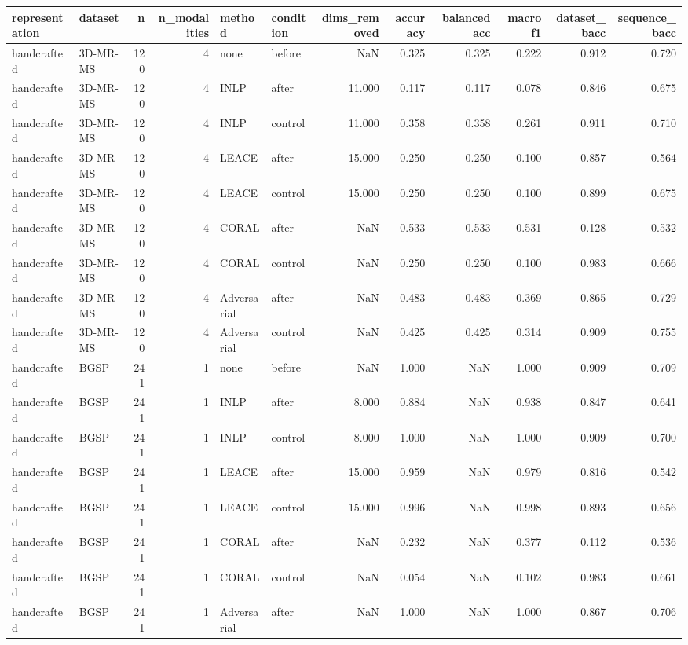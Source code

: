 \begin{tabular}{llrrllrrrrrr}
\toprule
representation & dataset & n & n\_modalities & method & condition & dims\_removed & accuracy & balanced\_acc & macro\_f1 & dataset\_bacc & sequence\_bacc \\
\midrule
handcrafted & 3D-MR-MS & 120 & 4 & none & before & NaN & 0.325 & 0.325 & 0.222 & 0.912 & 0.720 \\
handcrafted & 3D-MR-MS & 120 & 4 & INLP & after & 11.000 & 0.117 & 0.117 & 0.078 & 0.846 & 0.675 \\
handcrafted & 3D-MR-MS & 120 & 4 & INLP & control & 11.000 & 0.358 & 0.358 & 0.261 & 0.911 & 0.710 \\
handcrafted & 3D-MR-MS & 120 & 4 & LEACE & after & 15.000 & 0.250 & 0.250 & 0.100 & 0.857 & 0.564 \\
handcrafted & 3D-MR-MS & 120 & 4 & LEACE & control & 15.000 & 0.250 & 0.250 & 0.100 & 0.899 & 0.675 \\
handcrafted & 3D-MR-MS & 120 & 4 & CORAL & after & NaN & 0.533 & 0.533 & 0.531 & 0.128 & 0.532 \\
handcrafted & 3D-MR-MS & 120 & 4 & CORAL & control & NaN & 0.250 & 0.250 & 0.100 & 0.983 & 0.666 \\
handcrafted & 3D-MR-MS & 120 & 4 & Adversarial & after & NaN & 0.483 & 0.483 & 0.369 & 0.865 & 0.729 \\
handcrafted & 3D-MR-MS & 120 & 4 & Adversarial & control & NaN & 0.425 & 0.425 & 0.314 & 0.909 & 0.755 \\
handcrafted & BGSP & 241 & 1 & none & before & NaN & 1.000 & NaN & 1.000 & 0.909 & 0.709 \\
handcrafted & BGSP & 241 & 1 & INLP & after & 8.000 & 0.884 & NaN & 0.938 & 0.847 & 0.641 \\
handcrafted & BGSP & 241 & 1 & INLP & control & 8.000 & 1.000 & NaN & 1.000 & 0.909 & 0.700 \\
handcrafted & BGSP & 241 & 1 & LEACE & after & 15.000 & 0.959 & NaN & 0.979 & 0.816 & 0.542 \\
handcrafted & BGSP & 241 & 1 & LEACE & control & 15.000 & 0.996 & NaN & 0.998 & 0.893 & 0.656 \\
handcrafted & BGSP & 241 & 1 & CORAL & after & NaN & 0.232 & NaN & 0.377 & 0.112 & 0.536 \\
handcrafted & BGSP & 241 & 1 & CORAL & control & NaN & 0.054 & NaN & 0.102 & 0.983 & 0.661 \\
handcrafted & BGSP & 241 & 1 & Adversarial & after & NaN & 1.000 & NaN & 1.000 & 0.867 & 0.706 \\

\end{tabular}
